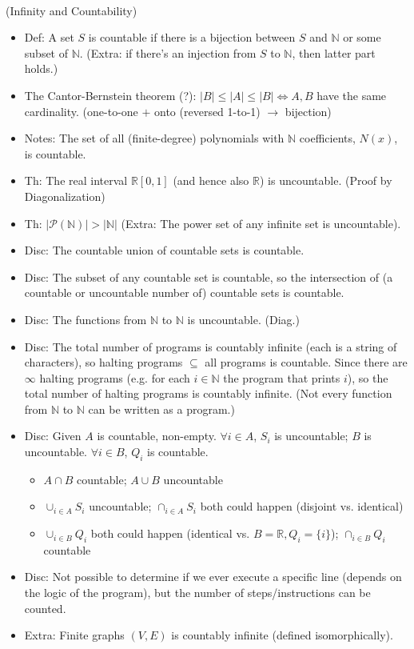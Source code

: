 \documentclass{article}
\begin{document}
 \\
(Infinity and Countability)
\begin{itemize}
	\item Def: A set $S$ is countable if there is a bijection between $S$ and $\mathbb{N}$ or some subset of $\mathbb{N}$. (Extra: if there's an injection from $S$ to $\mathbb{N}$, then latter part holds.)
	\item The Cantor-Bernstein theorem (?): $|B|\leq|A|\leq|B| \iff A,B$ have the same cardinality. (one-to-one $+$ onto (reversed 1-to-1) $\rightarrow$ bijection)
	\item Notes: The set of all (finite-degree) polynomials with $\mathbb{N}$ coefficients, $N(x)$, is countable.
	\item Th: The real interval $\mathbb{R}[0, 1]$ (and hence also $\mathbb{R}$) is uncountable. (Proof by Diagonalization)
	\item Th: $|\mathscr{P}(\mathbb{N})| > |\mathbb{N}|$ (Extra: The power set of any infinite set is uncountable).
	\item Disc: The countable union of countable sets is countable.
	\item Disc: The subset of any countable set is countable, so the intersection of (a countable or uncountable number of) countable sets is countable.
	\item Disc: The functions from $\mathbb{N}$ to $\mathbb{N}$ is uncountable. (Diag.)
	\item Disc: The total number of programs is countably infinite (each is a string of characters), so halting programs $\subseteq$ all programs is countable. Since there are $\infty$ halting programs (e.g. for each $i\in\mathbb{N}$ the program that prints $i$), so the total number of halting programs is countably infinite. (Not every function from $\mathbb{N}$ to $\mathbb{N}$ can be written as a program.)
	\item Disc: Given $A$ is countable, non-empty. $\forall i\in A$, $S_i$ is uncountable; $B$ is uncountable. $\forall i\in B$, $Q_i$ is countable.
	\begin{itemize}
		\item $A\cap B$ countable; $A\cup B$ uncountable
		\item $\cup_{i\in A} S_i$ uncountable; $\cap_{i\in A} S_i$ both could happen (disjoint vs. identical)
		\item $\cup_{i\in B} Q_i$ both could happen (identical vs. $B=\mathbb{R}, Q_i = \{i\}$); $\cap_{i\in B} Q_i$ countable
	\end{itemize}
	\item Disc: Not possible to determine if we ever execute a specific line (depends on the logic of the program), but the number of steps/instructions can be counted.
	\item Extra: Finite graphs $(V,E)$ is countably infinite (defined isomorphically).
\end{itemize}
\end{document}
